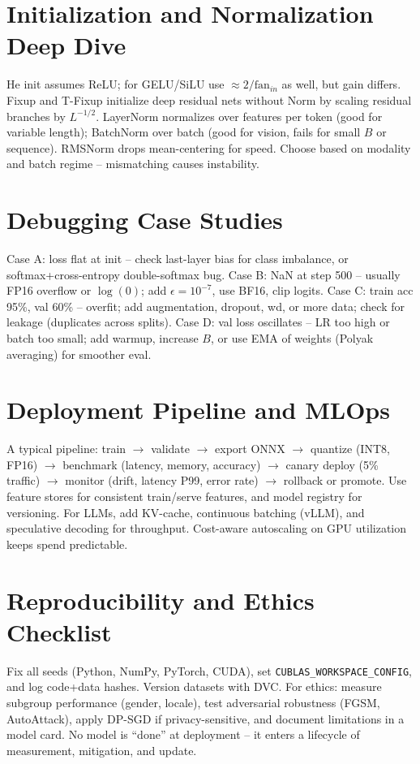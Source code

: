 \section{Initialization and Normalization Deep Dive}
He init assumes ReLU; for GELU/SiLU use $\approx2/\text{fan}_{in}$ as well, but
gain differs. Fixup and T-Fixup initialize deep residual nets without Norm by
scaling residual branches by $L^{-1/2}$. LayerNorm normalizes over features per
token (good for variable length); BatchNorm over batch (good for vision, fails
for small $B$ or sequence). RMSNorm drops mean-centering for speed. Choose
based on modality and batch regime -- mismatching causes instability.

\section{Debugging Case Studies}
Case A: loss flat at init -- check last-layer bias for class imbalance, or
softmax+cross-entropy double-softmax bug. Case B: NaN at step 500 -- usually
FP16 overflow or $\log(0)$; add $\epsilon=10^{-7}$, use BF16, clip logits.
Case C: train acc 95\%, val 60\% -- overfit; add augmentation, dropout, wd,
or more data; check for leakage (duplicates across splits). Case D: val loss
oscillates -- LR too high or batch too small; add warmup, increase $B$, or
use EMA of weights (Polyak averaging) for smoother eval.

\section{Deployment Pipeline and MLOps}
A typical pipeline: train $\to$ validate $\to$ export ONNX $\to$ quantize
(INT8, FP16) $\to$ benchmark (latency, memory, accuracy) $\to$ canary deploy
(5\% traffic) $\to$ monitor (drift, latency P99, error rate) $\to$ rollback
or promote. Use feature stores for consistent train/serve features, and model
registry for versioning. For LLMs, add KV-cache, continuous batching (vLLM),
and speculative decoding for throughput. Cost-aware autoscaling on GPU
utilization keeps spend predictable.

\section{Reproducibility and Ethics Checklist}
Fix all seeds (Python, NumPy, PyTorch, CUDA), set \texttt{CUBLAS\_WORKSPACE\_CONFIG},
and log code+data hashes. Version datasets with DVC. For ethics: measure
subgroup performance (gender, locale), test adversarial robustness (FGSM,
AutoAttack), apply DP-SGD if privacy-sensitive, and document limitations in a
model card. No model is ``done'' at deployment -- it enters a lifecycle of
measurement, mitigation, and update.

